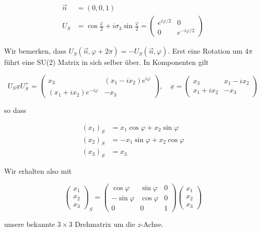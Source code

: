 \documentclass[10pt, letterpaper]{article}
\begin{document}
$$
\begin{aligned}
\vec{n} & =(0,0,1) \\
U_{S} & =\cos \frac{\varphi}{2}+i \sigma_{3} \sin \frac{\varphi}{2}=\left(\begin{array}{cc}
e^{i \varphi / 2} & 0 \\
0 & e^{-i \varphi / 2}
\end{array}\right)
\end{aligned}
$$

Wir bemerken, dass $U_{S}(\vec{n}, \varphi+2 \pi)=-U_{S}(\vec{n}, \varphi)$. Erst eine Rotation um $4 \pi$ führt eine SU(2) Matrix in sich selber über. In Komponenten gilt

$$
U_{S} \underline{x} U_{S}^{+}=\left(\begin{array}{cc}
x_{3} & \left(x_{1}-i x_{2}\right) e^{i \varphi} \\
\left(x_{1}+i x_{2}\right) e^{-i \varphi} & -x_{3}
\end{array}\right), \quad \underline{x}=\left(\begin{array}{cc}
x_{3} & x_{1}-i x_{2} \\
x_{1}+i x_{2} & -x_{3}
\end{array}\right)
$$

so dass

$$
\begin{aligned}
\left(x_{1}\right)_{S} & =x_{1} \cos \varphi+x_{2} \sin \varphi \\
\left(x_{2}\right)_{S} & =-x_{1} \sin \varphi+x_{2} \cos \varphi \\
\left(x_{3}\right)_{S} & =x_{3}
\end{aligned}
$$

Wir erhalten also mit

$$
\left(\begin{array}{l}
x_{1} \\
x_{2} \\
x_{3}
\end{array}\right)_{S}=\left(\begin{array}{ccc}
\cos \varphi & \sin \varphi & 0 \\
-\sin \varphi & \cos \varphi & 0 \\
0 & 0 & 1
\end{array}\right)\left(\begin{array}{l}
x_{1} \\
x_{2} \\
x_{3}
\end{array}\right)
$$

unsere bekannte $3 \times 3$ Drehmatrix um die $z$-Achse.
\end{document}
